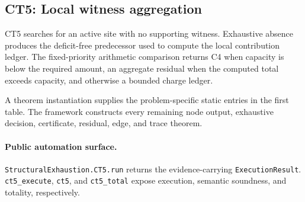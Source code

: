\subsection{CT5: Local witness aggregation}
\label{sec:ct5-automation}

CT5 searches for an active site with no supporting witness. Exhaustive absence produces the deficit-free predecessor used to compute the local contribution ledger. The fixed-priority arithmetic comparison returns C4 when capacity is below the required amount, an aggregate residual when the computed total exceeds capacity, and otherwise a bounded charge ledger.

A theorem instantiation supplies the problem-specific static entries in the first table. The framework constructs every remaining node output, exhaustive decision, certificate, residual, edge, and trace theorem.

\paragraph{Public automation surface.}
\texttt{StructuralExhaustion.CT5.run} returns the evidence-carrying \texttt{ExecutionResult}. \texttt{ct5\_\allowbreak{}execute}, \texttt{ct5}, and \texttt{ct5\_\allowbreak{}total} expose execution, semantic soundness, and totality, respectively.

